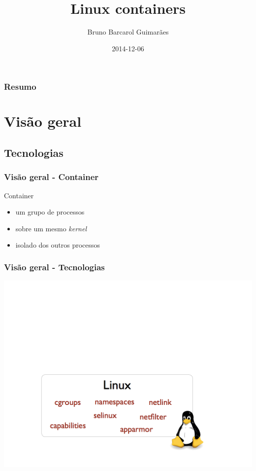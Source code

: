 \documentclass{beamer}
\title[Linux containers]{Linux containers}
\author{Bruno Barcarol Guimarães}
\institute[]{\textit{bbgstb@gmail.com}}
\date{2014-12-06}
\begin{document}
\begin{frame}
    \titlepage
\end{frame}

\begin{frame}
    \frametitle{Resumo}
    \tableofcontents
\end{frame}

\section{Visão geral}

\subsection{Tecnologias}

\begin{frame}
    \frametitle{Visão geral - Container}
    Container
    \begin{itemize}
        \item um grupo de processos
        \item sobre um mesmo \textit{kernel}
        \item isolado dos outros processos
    \end{itemize}
\end{frame}

\begin{frame}
    \frametitle{Visão geral - Tecnologias}
    \centering
    \includegraphics[width=1\linewidth]{img/docker_diagram_kernel.png}
\end{frame}
\end{document}
